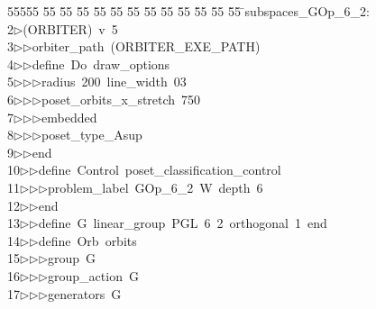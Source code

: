 %
%
\begin{tabbing}
55555 \= 55 \= 55 \= 55 \= 55 \= 55 \= 55 \= 55 \= 55 \= 55 \= 55 \= 55 \= 55 \= \>subspaces\_GOp\_6\_2:\\[0pt]
2\>$\triangleright$\>(ORBITER)\ v\ 5\ \\[0pt]
3\>$\triangleright$\>$\triangleright$\>orbiter\_path\ (ORBITER\_EXE\_PATH)\ \\[0pt]
4\>$\triangleright$\>$\triangleright$\>define\ Do\ draw\_options\ \\[0pt]
5\>$\triangleright$\>$\triangleright$\>$\triangleright$\>radius\ 200\ line\_width\ 03\ \\[0pt]
6\>$\triangleright$\>$\triangleright$\>$\triangleright$\>poset\_orbits\_x\_stretch\ 750\ \\[0pt]
7\>$\triangleright$\>$\triangleright$\>$\triangleright$\>embedded\ \\[0pt]
8\>$\triangleright$\>$\triangleright$\>$\triangleright$\>poset\_type\_Asup\ \\[0pt]
9\>$\triangleright$\>$\triangleright$\>end\ \\[0pt]
10\>$\triangleright$\>$\triangleright$\>define\ Control\ poset\_classification\_control\ \\[0pt]
11\>$\triangleright$\>$\triangleright$\>$\triangleright$\>problem\_label\ GOp\_6\_2\ W\ depth\ 6\ \\[0pt]
12\>$\triangleright$\>$\triangleright$\>end\ \\[0pt]
13\>$\triangleright$\>$\triangleright$\>define\ G\ linear\_group\ PGL\ 6\ 2\ orthogonal\ 1\ end\ \\[0pt]
14\>$\triangleright$\>$\triangleright$\>define\ Orb\ orbits\ \\[0pt]
15\>$\triangleright$\>$\triangleright$\>$\triangleright$\>group\ G\ \\[0pt]
16\>$\triangleright$\>$\triangleright$\>$\triangleright$\>group\_action\ G\ \\[0pt]
17\>$\triangleright$\>$\triangleright$\>$\triangleright$\>generators\ G\ \\[0pt]

\end{tabbing}
